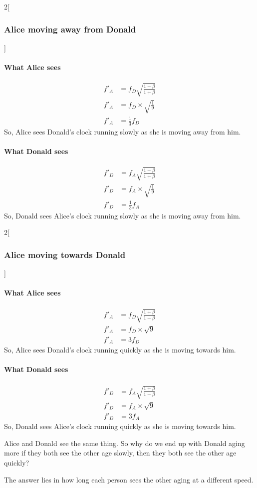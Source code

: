 		\begin{samepagecols}{2}[\subsubsection{Alice moving away from Donald}]
			\paragraph{What Alice sees}
			\begin{align*}
				f'_A &= f_D\sqrt{\frac{1 - \beta}{1 + \beta}}\\
				f'_A &= f_D \times \sqrt{\frac{1}{9}}\\
				f'_A &= \frac{1}{3}f_D
			\end{align*}
			So, Alice sees Donald's clock running slowly as she is moving away from him.

			\columnbreak

			\paragraph{What Donald sees}
			\begin{align*}
				f'_D &= f_A\sqrt{\frac{1 - \beta}{1 + \beta}}\\
				f'_D &= f_A \times \sqrt{\frac{1}{9}}\\
				f'_D &= \frac{1}{3}f_A
			\end{align*}
			So, Donald sees Alice's clock running slowly as she is moving away from him.
		\end{samepagecols}
		\begin{samepagecols}{2}[\subsubsection{Alice moving towards Donald}]
			\paragraph{What Alice sees}
			\begin{align*}
				f'_A &= f_D\sqrt{\frac{1 + \beta}{1 - \beta}}\\
				f'_A &= f_D \times \sqrt{9}\\
				f'_A &= 3 f_D
			\end{align*}
			So, Alice sees Donald's clock running quickly as she is moving towards him.

			\columnbreak

			\paragraph{What Donald sees}
			\begin{align*}
				f'_D &= f_A\sqrt{\frac{1 + \beta}{1 - \beta}}\\
				f'_D &= f_A \times \sqrt{9}\\
				f'_D &= 3 f_A
			\end{align*}
			So, Donald sees Alice's clock running quickly as she is moving towards him.
		\end{samepagecols}
		Alice and Donald see the same thing.
		So why do we end up with Donald aging more if they both see the other age slowly, then they both see the other age quickly?

		The answer lies in how long each person sees the other aging at a different speed.
